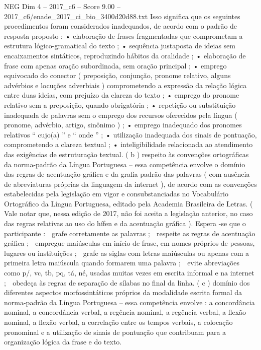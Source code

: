 \begin{textsample}{NEG Dim 4 – 2017\_c6 – Score 9.00 – 2017\_c6/enade\_2017\_ci\_bio\_3400d20d88.txt}
Isso significa que os seguintes procedimentos foram considerados inadequados, de acordo com o padrão de resposta proposto : • elaboração de frases fragmentadas que comprometam a estrutura lógico-gramatical do texto ; • sequência justaposta de ideias sem encaixamentos sintáticos, reproduzindo hábitos da oralidade ; • elaboração de frase com apenas oração subordinada, sem oração principal ; • emprego equivocado do conector ( preposição, conjunção, pronome relativo, alguns advérbios e locuções adverbiais ) comprometendo a expressão da relação lógica entre duas ideias, com prejuízo da clareza do texto ; • emprego do pronome relativo sem a preposição, quando obrigatória ; • repetição ou substituição inadequada de palavras sem o emprego dos recursos oferecidos pela língua ( pronome, advérbio, artigo, sinônimo ) ; • emprego inadequado dos pronomes relativos “ cujo(a) ” e “ onde ” ; • utilização inadequada dos sinais de pontuação, comprometendo a clareza textual ; • inteligibilidade relacionada ao atendimento das exigências de estruturação textual. ( b ) respeito às convenções ortográficas da norma-padrão da Língua Portuguesa – essa competência envolve o domínio das regras de acentuação gráfica e da grafia padrão das palavras ( com ausência de abreviaturas próprias da linguagem da internet ), de acordo com as convenções estabelecidas pela legislação em vigor e consubstanciadas no Vocabulário Ortográfico da Língua Portuguesa, editado pela Academia Brasileira de Letras. ( Vale notar que, nessa edição de 2017, não foi aceita a legislação anterior, no caso das regras relativas ao uso do hífen e da acentuação gráfica ).
Espera -se que o participante :  grafe corretamente as palavras ;  respeite as regras de acentuação gráfica ;  empregue maiúsculas em início de frase, em nomes próprios de pessoas, lugares ou instituições ;  grafe as siglas com letras maiúsculas ou apenas com a primeira letra maiúscula quando formarem uma palavra ;  evite abreviações como p/, vc, tb, pq, tá, né, usadas muitas vezes em escrita informal e na internet ;  obedeça às regras de separação de sílabas no final da linha. ( c ) domínio dos diferentes aspectos morfossintáticos próprios da modalidade escrita formal da norma-padrão da Língua Portuguesa – essa competência envolve : a concordância nominal, a concordância verbal, a regência nominal, a regência verbal, a flexão nominal, a flexão verbal, a correlação entre os tempos verbais, a colocação pronominal e a utilização de sinais de pontuação que contribuam para a organização lógica da frase e do texto.

\end{textsample}
